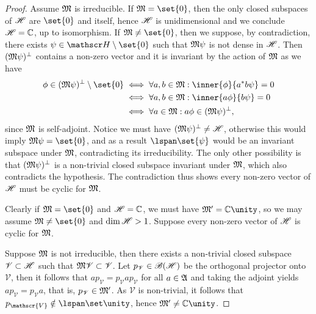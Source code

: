 \begin{proof}
    Assume \(\mathfrak{M}\) is irreducible. If \(\algebra{M} = \set{0}\), then the only closed subspaces of \(\mathscr{H}\) are \(\set{0}\) and itself, hence \(\mathscr{H}\) is unidimensional and we conclude \(\mathscr{H} = \mathbb{C}\), up to isomorphism. If \(\algebra{M} \neq \set{0}\), then we suppose, by contradiction, there exists \(\psi \in \hilbert \setminus \set{0}\) such that \(\mathfrak{M}\psi\) is not dense in \(\mathscr{H}\). Then \((\mathfrak{M}\psi)^\perp\) contains a non-zero vector and it is invariant by the action of \(\mathfrak{M}\) as we have
    \begin{align*}
        \phi \in (\algebra{M}\psi)^{\perp}\setminus\set{0} &\iff \forall a,b \in \algebra{M} : \inner{\phi}{a^{\ast}b\psi} = 0\\
                                                           &\iff \forall a,b \in \algebra{M} : \inner{a\phi}{b\psi} = 0\\
                                                           &\iff \forall a \in \algebra{M} : a\phi \in (\algebra{M}\psi)^\perp,
    \end{align*}
    since \(\mathfrak{M}\) is self-adjoint. Notice we must have \((\mathfrak{M}\psi)^\perp \neq \mathscr{H}\), otherwise this would imply \(\algebra{M}\psi = \set{0}\), and as a result \(\lspan\set{\psi}\) would be an invariant subspace under \(\mathfrak{M}\), contradicting its irreducibility. The only other possibility is that \((\mathfrak{M}\psi)^\perp\) is a non-trivial closed subspace invariant under \(\mathfrak{M}\), which also contradicts the hypothesis. The contradiction thus shows every non-zero vector of \(\mathscr{H}\) must be cyclic for \(\mathfrak{M}\).

    Clearly if \(\algebra{M} = \set{0}\) and \(\mathscr{H} = \mathbb{C}\), we must have \(\algebra{M}' = \mathbb{C} \unity\), so we may assume \(\algebra{M} \neq \set{0}\) and \(\dim\mathscr{H} > 1\). Suppose every non-zero vector of \(\mathscr{H}\) is cyclic for \(\mathfrak{M}\). 

    Suppose \(\mathfrak{M}\) is not irreducible, then there exists a non-trivial closed subspace \(\mathscr{V}\subset \mathscr{H}\) such that \(\mathfrak{M}\mathscr{V} \subset \mathscr{V}\). Let \(p_{\mathscr{V}}\in \mathscr{B}(\mathscr{H})\) be the orthogonal projector onto \(\mathscr{V}\), then it follows that \(ap_{\mathscr{V}} = p_{\mathscr{V}}a p_{\mathscr{V}}\) for all \(a \in \mathfrak{A}\) and taking the adjoint yields \(ap_{\mathscr{V}} = p_{\mathscr{V}} a\), that is, \(p_{\mathscr{V}} \in \mathfrak{M}'\). As \(\mathscr{V}\) is non-trivial, it follows that \(p_{\mathscr{V}} \notin \lspan\set\unity\), hence \(\algebra{M}' \neq \mathbb{C} \unity\).
\end{proof}

